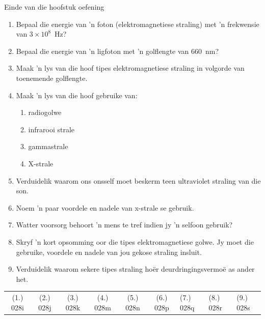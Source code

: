 \begin{eocexercises}{Einde van die hoofstuk oefening}
\begin{enumerate}[noitemsep, label=\textbf{\arabic*}. ] 
    \item Bepaal die energie van 'n foton (e\-lek\-tro\-mag\-ne\-tie\-se straling) met 'n frekwensie van $3\ensuremath{\times}{10}^{8}$~Hz?\newline
    \item Bepaal die energie van 'n ligfoton met 'n golflengte van 660~nm?\newline
    \item Maak 'n lys van die hoof tipes elektromagnetiese straling in volgorde van toenemende golflengte.\newline
    \item Maak 'n lys van die hoof gebruike van:
\begin{enumerate}[noitemsep, label=\textbf{\alph*}. ] 
    \item radiogolwe
    \item infrarooi strale
    \item gammastrale
    \item X-strale
\end{enumerate}
\item Verduidelik waarom ons onsself moet beskerm teen ultraviolet straling van die son. \newline
\item Noem 'n paar voordele en nadele van x-strale se gebruik. \newline
\item Watter voorsorg behoort 'n mens te tref indien jy 'n selfoon gebruik? \newline
\item Skryf 'n kort opsomming oor die tipes elektromagnetiese golwe. Jy moet die gebruike, voordele en nadele van jou gekose straling insluit.\newline
\item Verduidelik waarom sekere tipes straling ho\"er deurdringingsvermo\"e as ander het.\newline
\end{enumerate}
  \label{m38779**end}
  \label{459e2bef85baf867f5850bc8338cad3a**end}
\practiceinfo
 \par \begin{tabular}[h]{cccccc}
 (1.) 028i  &  (2.) 028j  &  (3.) 028k  &  (4.) 028m  &  (5.) 028n  &  (6.) 028p  &  (7.) 028q  &  (8.) 028r  &  (9.) 028s  & \end{tabular}
\end{eocexercises}
